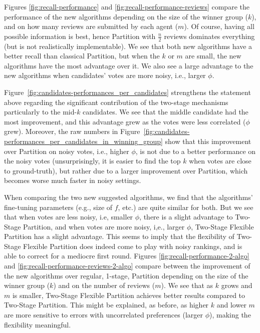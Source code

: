 \documentclass[letterpaper]{article}
\begin{document}
Figures \ref{fig:recall-performance} and \ref{fig:recall-performance-reviews} compare the performance of the new algorithms depending on the size of the winner group ($k$), and on how many reviews are submitted by each agent ($m$). Of course, having all possible information is best, hence Partition with $\frac{n}{2}$ reviews dominates everything (but is not realistically implementable). We see that both new algorithms have a better recall than classical Partition, but when the $k$ or $m$ are small, the new algorithms have the most advantage over it. We also see a large advantage to the new algorithms when candidates' votes are more noisy, i.e., larger $\phi$.

Figure~\ref{fig:candidates-performances_per_candidates} strengthens the statement above regarding the significant contribution of the two-stage mechanisms particularly to the mid-$k$ candidates. We see that the middle candidate had the most improvement, and this advantage grew as the votes were less correlated ($\phi$ grew). Moreover, the raw numbers in Figure~\ref{fig:candidates-performances_per_candidates_in_winning_group} show that this improvement over Partition on noisy votes, i.e., higher $\phi$, is not due to a better performance on the noisy votes (unsurprisingly, it is easier to find the top $k$ when votes are close to ground-truth), but rather due to a larger improvement over Partition, which becomes worse much faster in noisy settings.

When comparing the two new suggested algorithms, we find that the algorithms' fine-tuning parameters (e.g., size of $f$, etc.) are quite similar for both. But we see that when votes are less noisy, i.e, smaller $\phi$, there is a slight advantage to Two-Stage Partition, and when votes are more noisy, i,e., larger $\phi$, Two-Stage Flexible Partition has a slight advantage. This seems to imply that the flexibility of Two-Stage Flexible Partition does indeed come to play with noisy rankings, and is able to correct for a mediocre first round. Figures \ref{fig:recall-performance-2-algo} and \ref{fig:recall-performance-reviews-2-algo} compare between the improvement of the new algorithms over regular, 1-stage, Partition depending on the size of the winner group ($k$) and on the number of reviews ($m$). We see that as $k$ grows and $m$ is smaller, Two-Stage Flexible Partition achieves better results compared to Two-Stage Partition. This might be explained, as before, as higher $k$ and lower $m$ are more sensitive to errors with uncorrelated preferences (larger $\phi$), making the flexibility meaningful.
\end{document}
